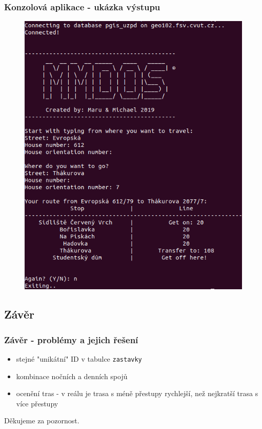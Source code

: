 \documentclass{beamer}
\begin{document}
\begin{frame}
\frametitle{Konzolová aplikace - ukázka výstupu}

\begin{figure}[h]
\includegraphics[scale=0.35]{ukazka.png}
\end{figure}
\end{frame}






\begin{frame}
\section{Závěr}
%
%
%
\frametitle{Závěr - problémy a jejich řešení}
\begin{itemize}
	\item stejné "unikátní" ID v tabulce \texttt{zastavky}
	\item kombinace nočních a denních spojů
	\item ocenění tras - v reálu je trasa s méně přestupy rychlejší, než nejkratší trasa s více přestupy
\end{itemize}
\end{frame}

\begin{frame}
\Huge{\centerline{Děkujeme za pozornost.}}


\end{frame}
\end{document}
